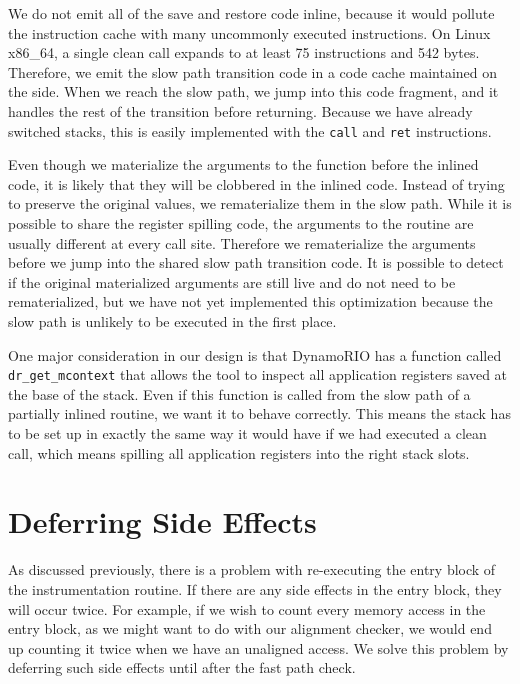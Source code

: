 We do not emit all of the save and restore code inline, because it would pollute
the instruction cache with many uncommonly executed instructions.  On Linux
x86\_64, a single clean call expands to at least 75 instructions and 542 bytes.
Therefore, we emit the slow path transition code in a code cache maintained on
the side.  When we reach the slow path, we jump into this code fragment, and it
handles the rest of the transition before returning.  Because we have already
switched stacks, this is easily implemented with the {\tt call} and {\tt ret}
instructions.

Even though we materialize the arguments to the function before the inlined
code, it is likely that they will be clobbered in the inlined code.  Instead of
trying to preserve the original values, we rematerialize them in the slow path.
While it is possible to share the register spilling code, the arguments to the
routine are usually different at every call site.  Therefore we rematerialize
the arguments before we jump into the shared slow path transition code.  It is
possible to detect if the original materialized arguments are still live and do
not need to be rematerialized, but we have not yet implemented this optimization
because the slow path is unlikely to be executed in the first place.

One major consideration in our design is that DynamoRIO has a function called
{\tt dr\_get\_mcontext} that allows the tool to inspect all application
registers saved at the base of the stack.  Even if this function is called from
the slow path of a partially inlined routine, we want it to behave correctly.
This means the stack has to be set up in exactly the same way it would have if
we had executed a clean call, which means spilling all application registers
into the right stack slots.

\section{Deferring Side Effects}
\label{sec:deferring}

As discussed previously, there is a problem with re-executing the entry block of
the instrumentation routine.  If there are any side effects in the entry block,
they will occur twice.  For example, if we wish to count every memory access in
the entry block, as we might want to do with our alignment checker, we would end
up counting it twice when we have an unaligned access.  We solve this problem by
deferring such side effects until after the fast path check.

